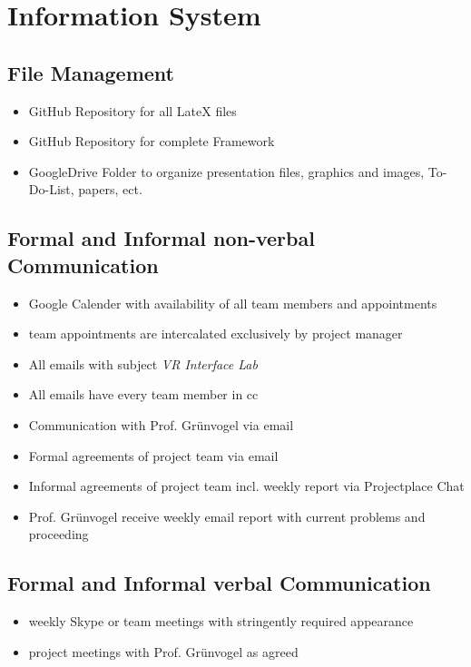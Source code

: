 \documentclass[a4paper, 12pt]{article}
\begin{document}
\section{Information System}
\subsection{File Management}
\begin{itemize}
\item GitHub Repository for all LateX files
\item GitHub Repository for complete Framework
\item GoogleDrive Folder to organize presentation files, graphics and images, To-Do-List, papers, ect. 
\end{itemize}

\subsection{Formal and Informal non-verbal Communication}
\begin{itemize}
\item Google Calender with availability of all team members and appointments
\item team appointments are  intercalated exclusively by project manager
\item All emails with subject \textit{VR Interface Lab} 
\item All emails have every team member in cc
\item Communication with Prof. Grünvogel via email
\item Formal agreements of project team via email
\item Informal agreements of project team incl. weekly report via Projectplace Chat
\item Prof. Grünvogel receive weekly email report with current problems and proceeding 
\end{itemize}
\subsection{Formal and Informal verbal Communication}
\begin{itemize}
	\item weekly Skype or team meetings with stringently required appearance
	\item project meetings with Prof. Grünvogel as agreed 
\end{itemize}
\end{document}
